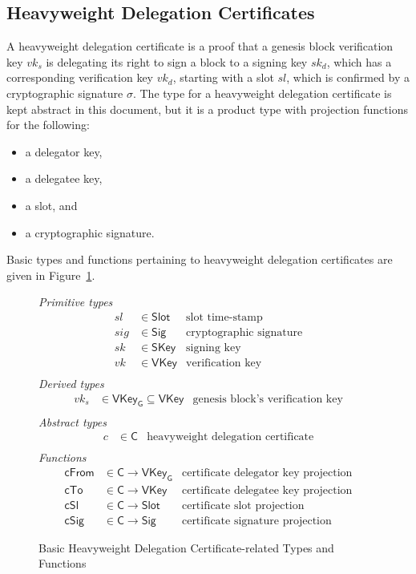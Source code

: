 \documentclass[11pt,a4paper]{article}
\newcommand{\fun}[1]{\mathsf{#1}}
\newcommand{\type}[1]{\mathsf{#1}}
\newcommand{\Slot}{\type{Slot}}
\newcommand{\HCert}{\type{C}}
\newcommand{\SKey}{\type{SKey}}
\newcommand{\VKey}{\type{VKey}}
\newcommand{\VKeyGen}{\type{VKey_G}}
\newcommand{\Sig}{\type{Sig}}
\newcommand{\totalf}{\to}
\begin{document}
\subsection{Heavyweight Delegation Certificates}
\label{sec:certificates}

A heavyweight delegation certificate is a proof that a genesis block
verification key $vk_s$ is delegating its right to sign a block to a signing
key $sk_d$, which has a corresponding verification key $vk_d$, starting with a
slot $sl$, which is confirmed by a cryptographic signature $\sigma$.
%
The type for a heavyweight delegation certificate is kept abstract in this
document, but it is a product type with projection functions for the
following:
%
\begin{itemize}
\item a delegator key,
\item a delegatee key,
\item a slot, and
\item a cryptographic signature.
\end{itemize}

Basic types and functions pertaining to heavyweight delegation certificates
are given in Figure~\ref{fig:cert-defs}.

\begin{figure}
  \emph{Primitive types}
  \begin{align*}
    sl & \in \Slot    & \text{slot time-stamp}\\
   sig & \in \Sig     & \text{cryptographic signature}\\
    sk & \in \SKey    & \text{signing key}\\
    vk & \in \VKey    & \text{verification key}\\
  \end{align*}
  \emph{Derived types}
  \begin{align*}
    vk_s & \in \VKeyGen \subseteq \VKey & \text{genesis block's verification key}\\
  \end{align*}
  \emph{Abstract types}
  \begin{align*}
    c & \in \HCert  & \text{heavyweight delegation certificate} \\
  \end{align*}
  \emph{Functions}
  \begin{align*}
    \text{$\fun{cFrom}$} & \in \HCert \totalf \VKeyGen & \text{certificate delegator key projection} \\
    \text{$\fun{cTo}$} & \in \HCert \totalf \VKey & \text{certificate delegatee key projection} \\
    \text{$\fun{cSl}$} & \in \HCert \totalf \Slot & \text{certificate slot projection} \\
    \text{$\fun{cSig}$} & \in \HCert \totalf \Sig & \text{certificate signature projection}
  \end{align*}
  \caption{Basic Heavyweight Delegation Certificate-related Types and Functions}
  \label{fig:cert-defs}
\end{figure}
\end{document}
